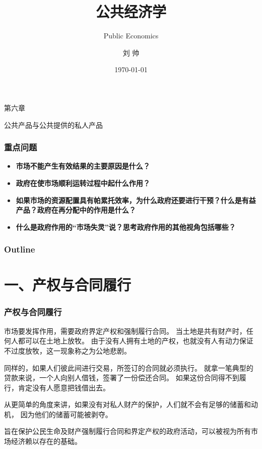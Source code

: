 \documentclass[aspectratio=169, 12pt]{beamer}
\title{公共经济学}
\subtitle{Public Economics}
\author[LIU ShHUAI]{刘 {  } 帅}
\institute{山西师范大学 {  } 经济与管理学院}
\date{\today}
\begin{document}
\maketitle

\begin{frame}[standout]
    第六章\par
    \addtolength{\parskip}{.4em}
    公共产品与公共提供的私人产品
\end{frame}

\begin{frame}[plain]
    \frametitle{重点问题}
    \begin{itemize}
        \item \textbf{市场不能产生有效结果的主要原因是什么？}
        \item \textbf{政府在使市场顺利运转过程中起什么作用？}
        \item \textbf{如果市场的资源配置具有帕累托效率，为什么政府还要进行干预？什么是有益产品？政府在再分配中的作用是什么？}
        \item \textbf{什么是政府作用的“市场失灵”说？思考政府作用的其他视角包括哪些？}
    \end{itemize}
\end{frame}

\begin{frame}[plain]
    \frametitle{Outline}
    \tableofcontents[hideallsubsections]
\end{frame}

\section{一、产权与合同履行}

\begin{frame}[plain]
    \frametitle{产权与合同履行}
    市场要发挥作用，需要政府界定产权和强制履行合同。
    当土地是共有财产时，任何人都可以在土地上放牧。
    由于没有人拥有土地的产权，也就没有人有动力保证不过度放牧，这一现象称之为公地悲剧。
    \par
    同样的，如果人们彼此间进行交易，所签订的合同就必须执行。
    就拿一笔典型的贷款来说，一个人向别人借钱，签署了一份偿还合同。
    如果这份合同得不到履行，肯定没有人愿意把钱借出去。
    \par
    从更简单的角度来讲，如果没有对私人财产的保护，人们就不会有足够的储蓄和动机，
    因为他们的储蓄可能被剥夺。
    \par
    旨在保护公民生命及财产强制履行合同和界定产权的政府活动，可以被视为所有市场经济赖以存在的基础。
\end{frame}
\end{document}
